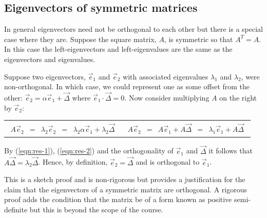 \documentclass[a4paper]{article}
\newcommand{\highlight}[1]{{\color{blue}#1}}
\begin{document}
\subsection{Eigenvectors of symmetric matrices}

In general eigenvectors need not be orthogonal to each other but there is a
special case where they are. Suppose the square matrix, $A$, is symmetric so
that $A^T = A$. In this case the left-eigenvectors and left-eigenvalues are the
same as the eigenvectors and eigenvalues.

Suppose two eigenvectors, $\vec{e}_1$ and $\vec{e}_2$ with associated
eigenvalues $\lambda_1$ and $\lambda_2$, were non-orthogonal. In which case, we
could represent one as some offset from the other: $\vec{e}_2 = \alpha \vec{e}_1
+ \vec{\Delta}$ where $\vec{e}_1 \cdot \vec{\Delta} = 0$.  Now consider
multiplying $A$ on the right by $\vec{e}_2$:

\begin{centering}\begin{tabular}{rl}
\parbox{0.4\columnwidth}{\centering
\begin{eqnarray}
  A \vec{e}_2 &=& \lambda_2 \vec{e}_2 \nonumber \\
  &=& \lambda_2 \alpha \vec{e}_1 + \lambda_2 \vec{\Delta} \label{eqn:res-1}
\end{eqnarray}\\
}&
\parbox{0.4\columnwidth}{\centering
\begin{eqnarray}
  A \vec{e}_2 &=& A \vec{e}_1 + A \vec{\Delta} \nonumber \\
  &=& \lambda_1 \vec{e}_1 + A \vec{\Delta} \label{eqn:res-2}
\end{eqnarray}\\
}\\
\end{tabular}
\end{centering}

\noindent By (\ref{eqn:res-1}), (\ref{eqn:res-2}) and the orthogonality of
$\vec{e}_1$ and $\vec{\Delta}$ it follows that $A\vec{\Delta} = \lambda_2
\vec{\Delta}$.  Hence, by definition, $\vec{e}_2 = \vec{\Delta}$ and is
orthogonal to $\vec{e}_1$.

This is a sketch proof and is non-rigorous but provides a justification for the
claim that \highlight{the eigenvectors of a symmetric matrix are orthogonal}. A
rigorous proof adds the condition that the matrix be of a form known as positive
semi-definite but this is beyond the scope of the course.
\end{document}
